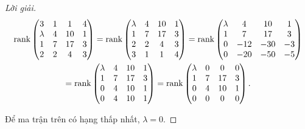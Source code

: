 \documentclass[class=nhvh-linear-algebra,crop=false]{standalone}
\begin{document}
\begin{proof}[Lời giải]
    \begingroup{}
    \allowdisplaybreaks{}
    \begin{gather*}
        \text{rank}\begin{pmatrix}
            3       & 1 & 1  & 4 \\
            \lambda & 4 & 10 & 1 \\
            1       & 7 & 17 & 3 \\
            2       & 2 & 4  & 3
        \end{pmatrix}
        =\text{rank}\begin{pmatrix}
            \lambda & 4 & 10 & 1 \\
            1       & 7 & 17 & 3 \\
            2       & 2 & 4  & 3 \\
            3       & 1 & 1  & 4 \\
        \end{pmatrix}
        =\text{rank}\begin{pmatrix}
            \lambda & 4   & 10  & 1  \\
            1       & 7   & 17  & 3  \\
            0       & -12 & -30 & -3 \\
            0       & -20 & -50 & -5 \\
        \end{pmatrix} \\
        =\text{rank}\begin{pmatrix}
            \lambda & 4 & 10 & 1 \\
            1       & 7 & 17 & 3 \\
            0       & 4 & 10 & 1 \\
            0       & 4 & 10 & 1 \\
        \end{pmatrix}
        =\text{rank}\begin{pmatrix}
            \lambda & 0 & 0  & 0 \\
            1       & 7 & 17 & 3 \\
            0       & 4 & 10 & 1 \\
            0       & 0 & 0  & 0 \\
        \end{pmatrix}.
    \end{gather*}
    \endgroup{}
    \par Để ma trận trên có hạng thấp nhất, $\lambda = 0$.
\end{proof}
\end{document}
